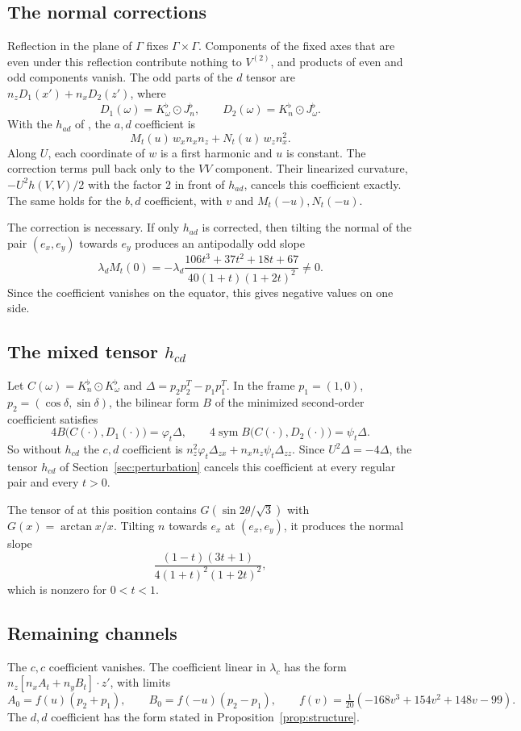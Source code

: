 \documentclass[11pt]{amsart}
\theoremstyle{definition}
\theoremstyle{remark}
\newcommand{\sym}{\odot}
\newcommand{\fl}{^{\flat}}
\begin{document}
\subsection{The normal corrections}
Reflection in the plane of $\Gamma$ fixes $\Gamma\times\Gamma$. Components of the fixed axes that are even under this reflection contribute nothing to $V^{(2)}$, and products of even and odd components vanish. The odd parts of the $d$ tensor are $n_zD_1(x')+n_xD_2(z')$, where
\[ D_1(\omega)=K\fl_\omega\sym J\fl_n,\qquad D_2(\omega)=K\fl_n\sym J\fl_\omega . \]
With the $h_{ad}$ of \cite{BH}, the $a,d$ coefficient is
\[ M_t(u)\,w_xn_xn_z+N_t(u)\,w_zn_x^2 . \]
Along $U$, each coordinate of $w$ is a first harmonic and $u$ is constant. The correction terms pull back only to the $VV$ component. Their linearized curvature, $-U^2h(V,V)/2$ with the factor $2$ in front of $h_{ad}$, cancels this coefficient exactly. The same holds for the $b,d$ coefficient, with $v$ and $M_t(-u),N_t(-u)$.

The correction is necessary. If only $h_{ad}$ is corrected, then tilting the normal of the pair $(e_x,e_y)$ towards $e_y$ produces an antipodally odd slope
\[ \lambda_dM_t(0)=-\lambda_d\frac{106t^3+37t^2+18t+67}{40(1+t)(1+2t)^2}\neq0 . \]
Since the coefficient vanishes on the equator, this gives negative values on one side.

\subsection{The mixed tensor \texorpdfstring{$h_{cd}$}{h\_cd}}
Let $C(\omega)=K\fl_n\sym K\fl_\omega$ and $\Delta=p_2p_2^{T}-p_1p_1^{T}$. In the frame $p_1=(1,0)$, $p_2=(\cos\delta,\sin\delta)$, the bilinear form $B$ of the minimized second-order coefficient satisfies
\[ 4B\big(C(\cdot),D_1(\cdot)\big)=\varphi_t\Delta,\qquad 4\operatorname{sym}B\big(C(\cdot),D_2(\cdot)\big)=\psi_t\Delta . \]
So without $h_{cd}$ the $c,d$ coefficient is $n_z^2\varphi_t\Delta_{zx}+n_xn_z\psi_t\Delta_{zz}$. Since $U^2\Delta=-4\Delta$, the tensor $h_{cd}$ of Section~\ref{sec:perturbation} cancels this coefficient at every regular pair and every $t>0$.

The tensor of \cite{BH} at this position contains $G(\sin2\theta/\sqrt3)$ with $G(x)=\arctan x/x$. Tilting $n$ towards $e_x$ at $(e_x,e_y)$, it produces the normal slope
\[ \frac{(1-t)(3t+1)}{4(1+t)^2(1+2t)^2}, \]
which is nonzero for $0<t<1$.

\subsection{Remaining channels}
The $c,c$ coefficient vanishes. The coefficient linear in $\lambda_c$ has the form $n_z[n_xA_t+n_yB_t]\cdot z'$, with limits
\[ A_0=f(u)(p_2+p_1),\qquad B_0=f(-u)(p_2-p_1),\qquad f(v)=\tfrac1{20}(-168v^3+154v^2+148v-99). \]
The $d,d$ coefficient has the form stated in Proposition~\ref{prop:structure}.
\end{document}
